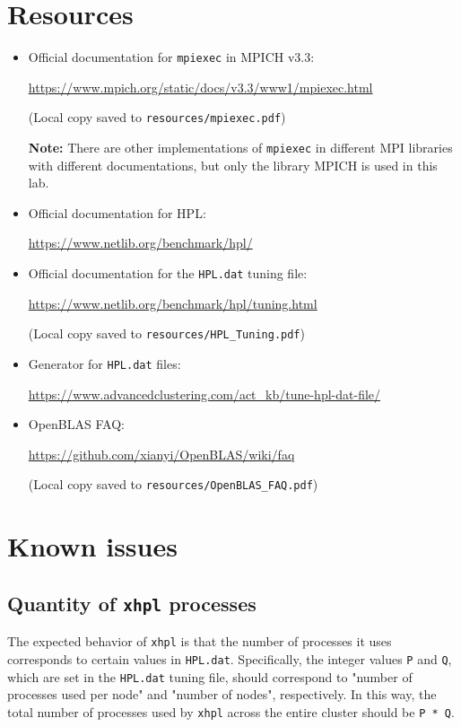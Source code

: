\documentclass{article}
\newcommand{\resource}[1]{(Local copy saved to \texttt{#1})}
\begin{document}
\section{Resources}
\begin{itemize}
    \item Official documentation for \texttt{mpiexec} in MPICH v3.3:
    
    \url{https://www.mpich.org/static/docs/v3.3/www1/mpiexec.html}
    
    \resource{resources/mpiexec.pdf}
    
    \textbf{Note:} There are other implementations of \texttt{mpiexec} in different MPI libraries with different documentations, but only the library MPICH is used in this lab.
    
    \item Official documentation for HPL:
    
    \url{https://www.netlib.org/benchmark/hpl/}
    
    \item Official documentation for the \texttt{HPL.dat} tuning file:
    
    \url{https://www.netlib.org/benchmark/hpl/tuning.html}
    
    \resource{resources/HPL\_Tuning.pdf}
    
    \item Generator for \texttt{HPL.dat} files:
    
    \url{https://www.advancedclustering.com/act_kb/tune-hpl-dat-file/}
    
    \item OpenBLAS FAQ:
    
    \url{https://github.com/xianyi/OpenBLAS/wiki/faq}
    
    \resource{resources/OpenBLAS\_FAQ.pdf}
\end{itemize}

\section{Known issues}

\subsection{Quantity of \texttt{xhpl} processes}

The expected behavior of \texttt{xhpl} is that the number of processes it uses corresponds to certain values in \texttt{HPL.dat}. Specifically, the integer values \texttt{P} and \texttt{Q}, which are set in the \texttt{HPL.dat} tuning file, should correspond to "number of processes used per node" and "number of nodes", respectively. In this way, the total number of processes used by \texttt{xhpl} across the entire cluster should be \texttt{P * Q}.
\end{document}
